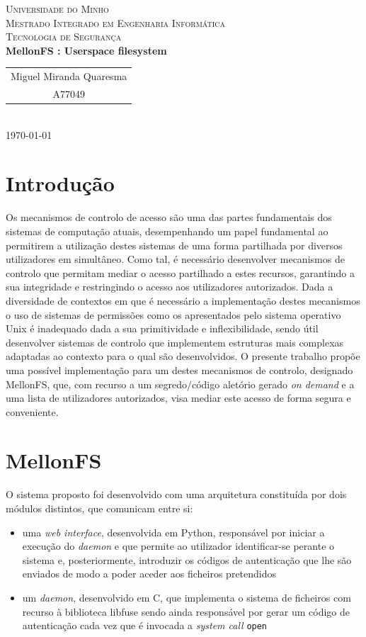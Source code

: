 \documentclass{article}
\begin{document}
{
\center
\textsc{\Large Universidade do Minho} \\ [0.5cm]
\textsc{\Large Mestrado Integrado em Engenharia Informática} \\ [0.5cm]
\textsc{\large Tecnologia de Segurança} \\ [0.5cm]

{\LARGE \bfseries MellonFS : Userspace filesystem } \\[0.5cm]

\begin{tabular}{c}
    Miguel Miranda Quaresma \\
    A77049  \\
\end{tabular} \\[0.5cm]

\today \\[1cm]
}

\section{Introdução}
Os mecanismos de controlo de acesso são uma das partes fundamentais dos sistemas de computação atuais, desempenhando um papel fundamental ao
permitirem a utilização destes sistemas de uma forma partilhada por diversos utilizadores em simultâneo. 
Como tal, é necessário desenvolver mecanismos de controlo que permitam mediar o acesso partilhado a estes recursos, garantindo a sua integridade 
e restringindo o acesso aos utilizadores autorizados. Dada a diversidade de contextos em que é necessário a implementação destes mecanismos o 
uso de sistemas de permissões como os apresentados pelo sistema operativo Unix é inadequado dada a sua primitividade e inflexibilidade, sendo 
útil desenvolver sistemas de controlo que implementem estruturas mais complexas adaptadas ao contexto para o qual são desenvolvidos. 
O presente trabalho propõe uma possível implementação para um destes mecanismos de controlo, designado MellonFS, que, com recurso a um 
segredo/código aletório gerado \textit{on demand} e a uma lista de utilizadores autorizados, visa mediar este acesso de forma segura e conveniente.

\section{MellonFS}
O sistema proposto foi desenvolvido com uma arquitetura constituída por dois módulos distintos, que comunicam entre si: 
\begin{itemize}
    \item uma \textit{web interface}, desenvolvida em Python, responsável por iniciar a execução do \textit{daemon} e que permite ao utilizador 
    identificar-se perante o sistema e, posteriormente, introduzir os códigos de autenticação que lhe são enviados de modo a poder aceder aos 
    ficheiros pretendidos
    \item um \textit{daemon}, desenvolvido em C, que implementa o sistema de ficheiros com recurso à biblioteca libfuse sendo ainda responsável 
    por gerar um código de autenticação cada vez que é invocada a \textit{system call} \texttt{open}
\end{itemize}
\end{document}
